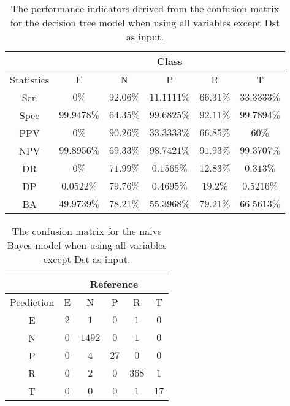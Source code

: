 \begin{table}[!ht]
	\centering
	\begin{tabular}{|c|c|c|c|c|c|}
		\hline
		 & \multicolumn{5}{c|}{Class} \\ \hline
		Statistics & E & N & P & R & T \\ \hline
		Sen & $0\%$ & $92.06\%$ & $11.1111\%$ & $66.31\%$ & $33.3333\%$ \\ \hline
		Spec & $99.9478\%$ & $64.35\%$ & $99.6825\%$ & $92.11\%$ & $99.7894\%$ \\ \hline
		PPV & $0\%$ & $90.26\%$ & $33.3333\%$ & $66.85\%$ & $60\%$ \\ \hline
		NPV & $99.8956\%$ & $69.33\%$ & $98.7421\%$ & $91.93\%$ & $99.3707\%$ \\ \hline
		DR & $0\%$ & $71.99\%$ & $0.1565\%$ & $12.83\%$ & $0.313\%$ \\ \hline
		DP & $0.0522\%$ & $79.76\%$ & $0.4695\%$ & $19.2\%$ & $0.5216\%$ \\ \hline
		BA & $49.9739\%$ & $78.21\%$ & $55.3968\%$ & $79.21\%$ & $66.5613\%$ \\ \hline
	\end{tabular}
	\caption{The performance indicators derived from the confusion matrix for the decision tree model when using all variables except Dst as input.}
	\label{tab:cs:reverse:noDst:C5.0}
\end{table}

\begin{table}[!ht]
	\centering
	\begin{tabular}{|c|c|c|c|c|c|}
		\hline
		 & \multicolumn{5}{|c|}{Reference} \\ \hline
		 Prediction & E & N & P & R & T \\ \hline
		 E & $2$ & $1$ & $0$ & $1$ & $0$ \\ \hline
		 N & $0$ & $1492$ & $0$ & $1$ & $0$ \\ \hline
		 P & $0$ & $4$ & $27$ & $0$ & $0$ \\ \hline
		 R & $0$ & $2$ & $0$ & $368$ & $1$ \\ \hline
		 T & $0$ & $0$ & $0$ & $1$ & $17$ \\ \hline
	\end{tabular}
	\caption{The confusion matrix for the naive Bayes model when using all variables except Dst as input.}
	\label{tab:cm:noDst:nb}
\end{table}

